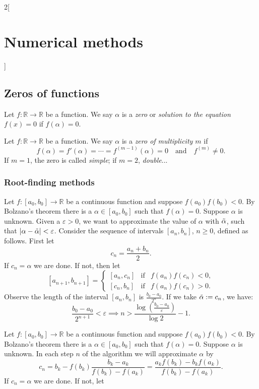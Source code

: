 \documentclass[class=article,10pt,crop=false]{standalone}
\begin{document}
\begin{multicols}{2}[\section{Numerical methods}]
\subsection{Zeros of functions}
\begin{definition}
Let $f:\mathbb{R}\rightarrow\mathbb{R}$ be a function. We say $\alpha$ is a \textit{zero} or \textit{solution to the equation $f(x)=0$} if $f(\alpha)=0$.
\end{definition}
\begin{definition}
Let $f:\mathbb{R}\rightarrow\mathbb{R}$ be a function. We say $\alpha$ is a \textit{zero of multiplicity $m$} if $$f(\alpha)=f'(\alpha)=\cdots=f^{(m-1)}(\alpha)=0\quad\text{and}\quad f^{(m)}\ne0.$$ If $m=1$, the zero is called \textit{simple}; if $m=2$, \textit{double}...
\end{definition}
\subsubsection*{Root-finding methods}
\begin{theorem}
Let $f:[a_0,b_0]\rightarrow\mathbb{R}$ be a continuous function and suppose $f(a_0)f(b_0)<0$. By Bolzano's theorem there is a $\alpha\in[a_0,b_0]$ such that $f(\alpha)=0$. Suppose $\alpha$ is unknown. Given a $\varepsilon>0$, we want to approximate the value of $\alpha$ with $\Tilde{\alpha}$, such that $|\alpha-\Tilde{\alpha}|<\varepsilon$. Consider the sequence of intervals $[a_n,b_n]$, $n\geq 0$, defined as follows. First let $$c_n=\frac{a_n+b_n}{2}.$$ If $c_n=\alpha$ we are done. If not, then let
$$[a_{n+1},b_{n+1}]=\left\{\begin{array}{ccc}
    [a_n,c_n] & \text{if} & f(a_n)f(c_n)<0, \\
    \left[c_n,b_n\right] & \text{if} & f(a_n)f(c_n)>0.
\end{array}\right.$$ Observe the length of the interval $[a_n,b_n]$ is $\frac{b_0-a_0}{2^n}$. If we take $\Tilde{\alpha}:=c_n$, we have: $$\frac{b_0-a_0}{2^{n+1}}<\varepsilon\implies n>\frac{\log\left(\frac{b_0-a_0}{\varepsilon}\right)}{\log 2}-1.$$
\end{theorem}
\begin{theorem}
Let $f:[a_0,b_0]\rightarrow\mathbb{R}$ be a continuous function and suppose $f(a_0)f(b_0)<0$. By Bolzano's theorem there is a $\alpha\in[a_0,b_0]$ such that $f(\alpha)=0$. Suppose $\alpha$ is unknown. In each step $n$ of the algorithm we will approximate $\alpha$ by $$c_n=b_k-f(b_k)\frac{b_k-a_k}{f(b_k)-f(a_k)}=\frac{a_kf(b_k)-b_kf(a_k)}{f(b_k)-f(a_k)}.$$ If $c_n=\alpha$ we are done. If not, let

\end{theorem}
\end{multicols}
\end{document}
